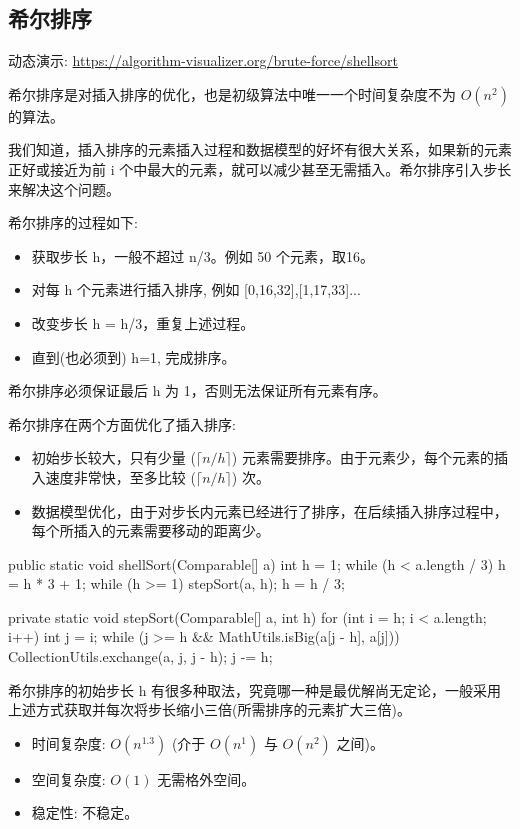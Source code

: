 \subsection{希尔排序}

动态演示: \url{https://algorithm-visualizer.org/brute-force/shellsort}

希尔排序是对插入排序的优化，也是初级算法中唯一一个时间复杂度不为 $O(n^2)$ 的算法。

我们知道，插入排序的元素插入过程和数据模型的好坏有很大关系，如果新的元素正好或接近为前 i 个中最大的元素，就可以减少甚至无需插入。希尔排序引入步长来解决这个问题。

希尔排序的过程如下:
\begin{itemize}
  \item 获取步长 h，一般不超过 n/3。例如 50 个元素，取16。
  \item 对每 h 个元素进行插入排序, 例如 [0,16,32],[1,17,33]... 
  \item 改变步长 h = h/3，重复上述过程。
  \item 直到(也必须到) h=1, 完成排序。
\end{itemize}

希尔排序必须保证最后 h 为 1，否则无法保证所有元素有序。

希尔排序在两个方面优化了插入排序:
\begin{itemize}
  \item 初始步长较大，只有少量 ($\lceil n/h \rceil$) 元素需要排序。由于元素少，每个元素的插入速度非常快，至多比较 ($\lceil n/h \rceil$) 次。
  \item 数据模型优化，由于对步长内元素已经进行了排序，在后续插入排序过程中，每个所插入的元素需要移动的距离少。
\end{itemize}

\begin{Java}
public static void shellSort(Comparable[] a) {
    int h = 1;
    while (h < a.length / 3) h = h * 3 + 1;
    while (h >= 1) {
        stepSort(a, h);
        h = h / 3;
    }
}

private static void stepSort(Comparable[] a, int h) {
    for (int i = h; i < a.length; i++) {
        int j = i;
        while (j >= h && MathUtils.isBig(a[j - h], a[j])) {
            CollectionUtils.exchange(a, j, j - h);
            j -= h;
        }
    }
}
\end{Java}

希尔排序的初始步长 h 有很多种取法，究竟哪一种是最优解尚无定论，一般采用上述方式获取并每次将步长缩小三倍(所需排序的元素扩大三倍)。

\begin{itemize}
  \item 时间复杂度: $O(n^{1.3})$ (介于 $O(n^1)$ 与 $O(n^2)$ 之间)。
  \item 空间复杂度: $O(1)$ 无需格外空间。
  \item 稳定性: 不稳定。
\end{itemize}

\newpage